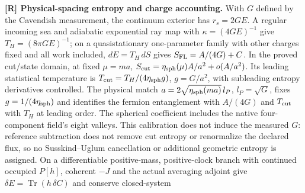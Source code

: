 \noindent\textbf{[R] Physical-spacing entropy and charge accounting.}
With $G$ defined by the Cavendish measurement, the continuum exterior has
$r_s=2GE$. A regular incoming sea and adiabatic exponential ray map
with $\kappa=(4GE)^{-1}$ give
$T_H=(8\pi GE)^{-1}$; on a quasistationary one-parameter family with
other charges fixed and all work included, $dE=T_H\,dS$ gives
$S_{\rm FL}=A/(4G)+C$. In the proved cut/state domain, at fixed $\mu=ma$,
$S_{\rm cut}=\eta_{\rm sph}(\mu)A/a^2+o(A/a^2)$.
Its leading statistical temperature is
$T_{\rm cut}=T_H/(4\eta_{\rm sph}g)$, $g=G/a^2$, with subleading
entropy derivatives controlled. The physical match
$a=2\sqrt{\eta_{\rm sph}(ma)}\,l_P$, $l_P=\sqrt G$, fixes
$g=1/(4\eta_{\rm sph})$ and identifies the fermion entanglement with
$A/(4G)$ and $T_{\rm cut}$ with $T_H$ at leading order.
The spherical coefficient includes the native four-component field's
eight valleys. This calibration does not induce the measured $G$:
reference subtraction does not remove cut entropy or renormalize the
declared flux, so no Susskind--Uglum cancellation or additional geometric
entropy is assigned. On a differentiable positive-mass, positive-clock
branch with continued occupied $P[h]$, coherent $-J$ and the actual averaging adjoint
give $\delta E=\operatorname{Tr}(h\,\delta C)$ and conserve closed-system
